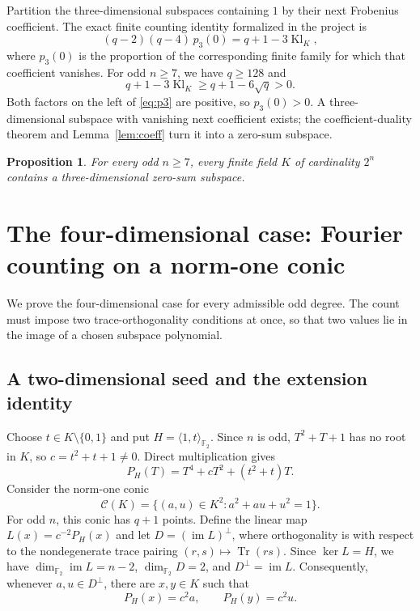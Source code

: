 \documentclass[11pt]{amsart}
\numberwithin{equation}{section}
\newtheorem{proposition}[theorem]{Proposition}
\theoremstyle{definition}
\theoremstyle{remark}
\newcommand{\Ftwo}{\mathbb F_2}
\newcommand{\tr}{\operatorname{Tr}}
\newcommand{\dimf}{\dim_{\Ftwo}}
\begin{document}
Partition the three-dimensional subspaces containing $1$ by their next Frobenius coefficient. The exact finite counting identity formalized in the project is
\begin{equation}\label{eq:p3}
 (q-2)(q-4)\,p_3(0)=q+1-3\operatorname{Kl}_K,
\end{equation}
where $p_3(0)$ is the proportion of the corresponding finite family for which that coefficient vanishes. For odd $n\ge7$, we have $q\ge128$ and
\[
 q+1-3\operatorname{Kl}_K\ge q+1-6\sqrt q>0.
\]
Both factors on the left of \eqref{eq:p3} are positive, so $p_3(0)>0$. A three-dimensional subspace with vanishing next coefficient exists; the coefficient-duality theorem and Lemma~\ref{lem:coeff} turn it into a zero-sum subspace.

\begin{proposition}\label{prop:k3}
For every odd $n\ge7$, every finite field $K$ of cardinality $2^n$ contains a three-dimensional zero-sum subspace.
\end{proposition}

\section{The four-dimensional case: Fourier counting on a norm-one conic}

We prove the four-dimensional case for every admissible odd degree. The count must impose two trace-orthogonality conditions at once, so that two values lie in the image of a chosen subspace polynomial.

\subsection{A two-dimensional seed and the extension identity}

Choose $t\in K\setminus\{0,1\}$ and put $H=\langle1,t\rangle_{\Ftwo}$. Since $n$ is odd, $T^2+T+1$ has no root in $K$, so $c=t^2+t+1\ne0$. Direct multiplication gives
\[
 P_H(T)=T^4+cT^2+(t^2+t)T.
\]
Consider the norm-one conic
\begin{equation}\label{eq:normcurve}
 \mathcal C(K)=\{(a,u)\in K^2:a^2+au+u^2=1\}.
\end{equation}
For odd $n$, this conic has $q+1$ points. Define the linear map $L(x)=c^{-2}P_H(x)$ and let $D=(\operatorname{im}L)^\perp$, where orthogonality is with respect to the nondegenerate trace pairing $(r,s)\mapsto\tr(rs)$. Since $\ker L=H$, we have $\dimf\operatorname{im}L=n-2$, $\dimf D=2$, and $D^\perp=\operatorname{im}L$. Consequently, whenever $a,u\in D^\perp$, there are $x,y\in K$ such that
\[
 P_H(x)=c^2a,\qquad P_H(y)=c^2u.
\]
\end{document}
